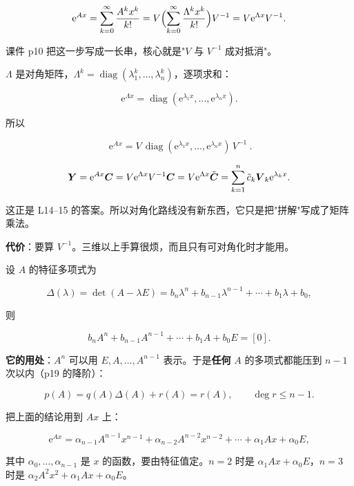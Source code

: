 \documentclass[11pt]{ctexart}
\newcommand{\diag}{\operatorname{diag}}
\begin{document}
\[
\mathrm{e}^{Ax}=\sum_{k=0}^{\infty}\frac{A^kx^k}{k!}
=V\Bigl(\sum_{k=0}^{\infty}\frac{\Lambda^kx^k}{k!}\Bigr)V^{-1}
=V\mathrm{e}^{\Lambda x}V^{-1}.
\]

课件 p10 把这一步写成一长串，核心就是"$V$ 与 $V^{-1}$ 成对抵消"。


$\Lambda$ 是对角矩阵，$\Lambda^k=\diag(\lambda_1^k,\dots,\lambda_n^k)$，逐项求和：

\[
\mathrm{e}^{\Lambda x}=\diag(\mathrm{e}^{\lambda_1x},\dots,\mathrm{e}^{\lambda_nx}).
\]

所以

\[
\boxed{\ \mathrm{e}^{Ax}=V\,\diag(\mathrm{e}^{\lambda_1x},\dots,\mathrm{e}^{\lambda_nx})\,V^{-1}\ }.
\]


\[
\boldsymbol{Y}=\mathrm{e}^{Ax}\boldsymbol{C}=V\mathrm{e}^{\Lambda x}V^{-1}\boldsymbol{C}
=V\mathrm{e}^{\Lambda x}\tilde{\boldsymbol{C}}
=\sum_{k=1}^{n}\tilde c_k\boldsymbol{V}_k\mathrm{e}^{\lambda_kx}.
\]

这正是 L14--15 的答案。所以对角化路线没有新东西，它只是把"拼解"写成了矩阵乘法。

\textbf{代价}：要算 $V^{-1}$。三维以上手算很烦，而且只有可对角化时才能用。



设 $A$ 的特征多项式为

\[
\Delta(\lambda)=\det(A-\lambda E)=b_n\lambda^n+b_{n-1}\lambda^{n-1}+\cdots+b_1\lambda+b_0,
\]

则

\[
b_nA^n+b_{n-1}A^{n-1}+\cdots+b_1A+b_0E=[0].
\]

\textbf{它的用处}：$A^n$ 可以用 $E,A,\dots,A^{n-1}$ 表示。于是\textbf{任何} $A$ 的多项式都能压到 $n-1$ 次以内（p19 的降阶）：

\[
p(A)=q(A)\Delta(A)+r(A)=r(A),\qquad \deg r\le n-1 .
\]


把上面的结论用到 $Ax$ 上：

\[
\mathrm{e}^{Ax}=\alpha_{n-1}A^{n-1}x^{n-1}+\alpha_{n-2}A^{n-2}x^{n-2}+\cdots+\alpha_1Ax+\alpha_0E,
\]

其中 $\alpha_0,\dots,\alpha_{n-1}$ 是 $x$ 的函数，要由特征值定。$n=2$ 时是 $\alpha_1Ax+\alpha_0E$，$n=3$ 时是 $\alpha_2A^2x^2+\alpha_1Ax+\alpha_0E$。
\end{document}

